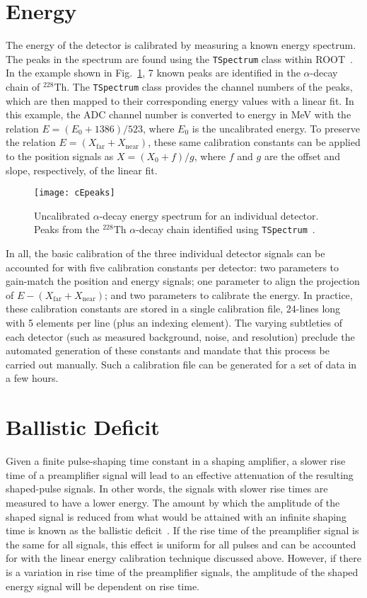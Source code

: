 \section{Energy}
The energy of the detector is calibrated by measuring a known energy spectrum.  The peaks in the spectrum are found using the \texttt{TSpectrum} class within ROOT~\cite{Morhac_2000}.  In the example shown in Fig.~\ref{peakfit}, 7 known peaks are identified in the $\alpha$-decay chain of $^{228}$Th.  The \texttt{TSpectrum} class provides the channel numbers of the peaks, which are then mapped to their corresponding energy values with a linear fit.  In this example, the ADC channel number is converted to energy in MeV with the relation $E=(E_0+1386)/523$, where $E_0$ is the uncalibrated energy.  To preserve the relation $E=(X_\mathrm{far} + X_\mathrm{near})$, these same calibration constants can be applied to the position signals as $X=(X_0+f)/g$, where $f$ and $g$ are the offset and slope, respectively, of the linear fit.

\begin{figure}%
\centering
\texttt{[image: cEpeaks]}%
\caption[Uncalibrated $\alpha$-decay energy spectrum for an individual detector]{Uncalibrated $\alpha$-decay energy spectrum for an individual detector.   Peaks from the $^{228}$Th $\alpha$-decay chain identified using \texttt{TSpectrum}~\cite{Morhac_2000}.}%
\label{peakfit}%
\end{figure}

In all, the basic calibration of the three individual detector signals can be accounted for with five calibration constants per detector: two parameters to gain-match the position and energy signals; one parameter to align the projection of $E-(X_\textrm{far}+X_\textrm{near})$; and two parameters to calibrate the energy.  In practice, these calibration constants are stored in a single calibration file, 24-lines long with 5 elements per line (plus an indexing element).  The varying subtleties of each detector (such as measured background, noise, and resolution) preclude the automated generation of these constants and mandate that this process be carried out manually.  Such a calibration file can be generated for a set of data in a few hours.

\section{Ballistic Deficit}
Given a finite pulse-shaping time constant in a shaping amplifier, a slower rise time of a preamplifier signal will  lead to an effective attenuation of the resulting shaped-pulse signals.  In other words, the signals with slower rise times are measured to have a lower energy.  The amount by which the amplitude of the shaped signal is reduced from what would be attained with an infinite shaping time is known as the ballistic deficit~\cite{Knoll_1979}.  If the rise time of the preamplifier signal is the same for all signals, this effect is uniform for all pulses and can be accounted for with the linear energy calibration technique discussed above.  However, if there is a variation in rise time of the preamplifier signals, the amplitude of the shaped energy signal will be dependent on rise time.

